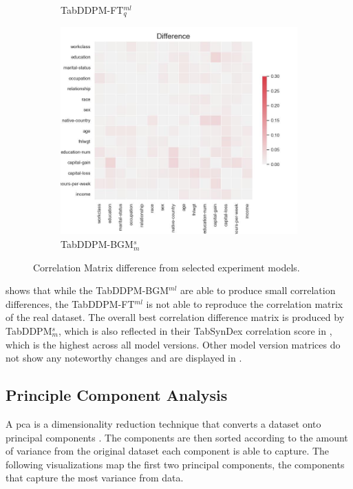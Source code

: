 \begin{figure}[h]
\begin{subfigure}{0.3\textwidth}
		\caption{TabDDPM-FT$^{ml}_q$}
	\end{subfigure}
	\hfill
	\begin{subfigure}{0.3\textwidth}
		\includegraphics[width=\textwidth]{images/correlation_difference/tab-ddpm-bgm-simTune-minmax.jpg}
		\caption{TabDDPM-BGM$^{s}_m$}
	\end{subfigure}
	\caption[Correlation plots Experiment Models]{Correlation Matrix difference from selected experiment models.}
	\label{fig:corr_diffusion}
\end{figure}



 shows that while the TabDDPM-BGM$^{ml}$ are able to produce small correlation differences, the TabDDPM-FT$^{ml}$ is not able to reproduce
the correlation matrix of the real dataset.
The overall best correlation difference matrix is produced by TabDDPM$^{s}_m$, which is also reflected in their TabSynDex correlation score in , which is the highest across all model versions.
Other model version matrices do not show any noteworthy changes and are displayed in .

\subsection{Principle Component Analysis}
\label{ch:results-pca}

A \gls{pca} is a dimensionality reduction technique that converts a dataset onto principal components \cite{brenninkmeijer2019GenerationEvaluationTabular}.
The components are then sorted according to the amount of variance from the original dataset each component is able to capture.
The following visualizations map the first two principal components, \ie the components that capture the most variance from data.


